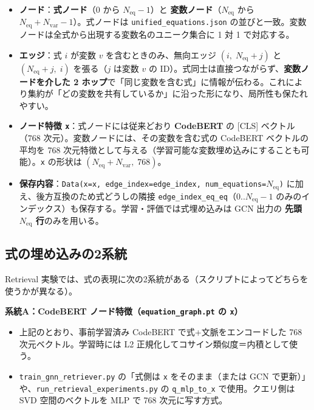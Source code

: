 \documentclass[11pt,a4paper]{jsarticle}
\begin{document}
\begin{itemize}[nosep]
  \item \textbf{ノード}：\textbf{式ノード}（0 から $N_{\mathrm{eq}}-1$）と \textbf{変数ノード}（$N_{\mathrm{eq}}$ から $N_{\mathrm{eq}}+N_{\mathrm{var}}-1$）。式ノードは \texttt{unified\_equations.json} の並びと一致。変数ノードは全式から出現する変数名のユニーク集合に 1 対 1 で対応する。
  \item \textbf{エッジ}：式 $i$ が変数 $v$ を含むときのみ、無向エッジ $(i,\; N_{\mathrm{eq}}+j)$ と $(N_{\mathrm{eq}}+j,\; i)$ を張る（$j$ は変数 $v$ の ID）。式同士は直接つながらず、\textbf{変数ノードを介した 2 ホップ}で「同じ変数を含む式」に情報が伝わる。これにより集約が「どの変数を共有しているか」に沿った形になり、局所性も保たれやすい。
  \item \textbf{ノード特徴 \texttt{x}}：式ノードには従来どおり \textbf{CodeBERT} の [CLS] ベクトル（768 次元）。変数ノードには、その変数を含む式の CodeBERT ベクトルの平均を 768 次元特徴として与える（学習可能な変数埋め込みにすることも可能）。\texttt{x} の形状は $(N_{\mathrm{eq}}+N_{\mathrm{var}},\; 768)$。
  \item \textbf{保存内容}：\texttt{Data(x=x, edge\_index=edge\_index, num\_equations=}$N_{\mathrm{eq}}$\texttt{)} に加え、後方互換のため式どうしの隣接 \texttt{edge\_index\_eq\_eq}（0..$N_{\mathrm{eq}}-1$ のみのインデックス）も保存する。学習・評価では式埋め込みは GCN 出力の \textbf{先頭 $N_{\mathrm{eq}}$ 行}のみを用いる。
\end{itemize}

\subsection{式の埋め込みの2系統}
Retrieval 実験では、式の表現に次の2系統がある（スクリプトによってどちらを使うかが異なる）。

\textbf{系統A：CodeBERT ノード特徴（\texttt{equation\_graph.pt} の \texttt{x}）}
\begin{itemize}[nosep]
  \item 上記のとおり、事前学習済み CodeBERT で式+文脈をエンコードした 768 次元ベクトル。学習時には L2 正規化してコサイン類似度＝内積として使う。
  \item \texttt{train\_gnn\_retriever.py} の「式側は \texttt{x} をそのまま（または GCN で更新）」や、\texttt{run\_retrieval\_experiments.py} の \texttt{q\_mlp\_to\_x} で使用。クエリ側は SVD 空間のベクトルを MLP で 768 次元に写す方式。
\end{itemize}
\end{document}
